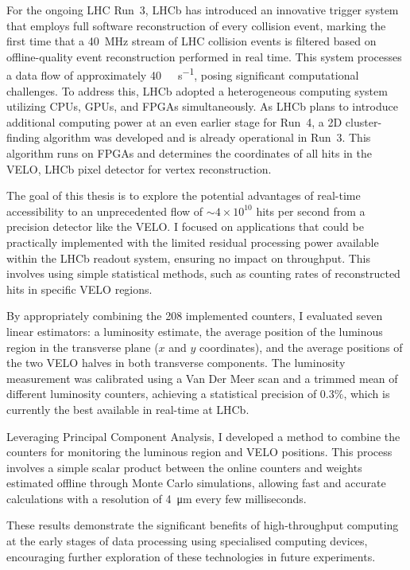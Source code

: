 For the ongoing LHC Run~3, LHCb has introduced an innovative trigger system that employs full software reconstruction of every collision event, marking the first time that a \SI{40}{\mega\hertz} stream of LHC collision events is filtered based on offline-quality event reconstruction performed in real time. This system processes a data flow of approximately \SI{40}{\tera\bit\per\second}, posing significant computational challenges. To address this, LHCb adopted a heterogeneous computing system utilizing CPUs, GPUs, and FPGAs simultaneously. As LHCb plans to introduce additional computing power at an even earlier stage for Run~4, a 2D cluster-finding algorithm was developed and is already operational in Run~3. This algorithm runs on FPGAs and determines the coordinates of all hits in the VELO, LHCb pixel detector for vertex reconstruction.

The goal of this thesis is to explore the potential advantages of real-time accessibility to an unprecedented flow of $\sim4 \times 10^{10}$ hits per second from a precision detector like the VELO. I focused on applications that could be practically implemented with the limited residual processing power available within the LHCb readout system, ensuring no impact on throughput. This involves using simple statistical methods, such as counting rates of reconstructed hits in specific VELO regions.

By appropriately combining the 208 implemented counters, I evaluated seven linear estimators: a luminosity estimate, the average position of the luminous region in the transverse plane ($x$ and $y$ coordinates), and the average positions of the two VELO halves in both transverse components. The luminosity measurement was calibrated using a Van Der Meer scan and a trimmed mean of different luminosity counters, achieving a statistical precision of $0.3\%$, which is currently the best available in real-time at LHCb.

Leveraging Principal Component Analysis, I developed a method to combine the counters for monitoring the luminous region and VELO positions. This process involves a simple scalar product between the online counters and weights estimated offline through Monte Carlo simulations, allowing fast and accurate calculations with a resolution of \SI{4}{\micro\meter} every few milliseconds. 

These results demonstrate the significant benefits of high-throughput computing at the early stages of data processing using specialised computing devices, encouraging further exploration of these technologies in future experiments.